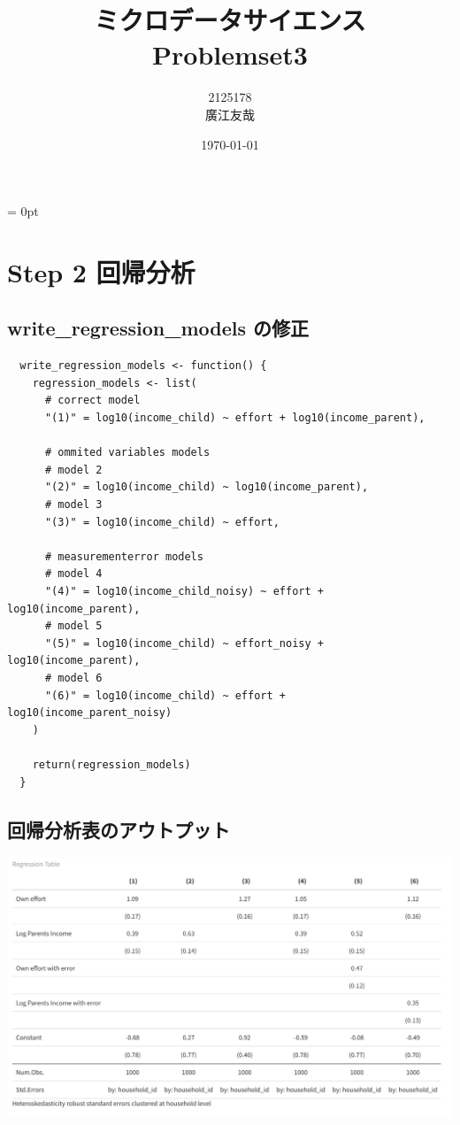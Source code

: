 \documentclass{article}
\begin{document}
\parindent = 0pt

\title{ミクロデータサイエンス\\Problemset3}
\author{2125178\\廣江友哉}
\date{\today}
\maketitle


\section{Step 2 回帰分析}

\subsection{write\_regression\_models の修正}

\begin{lstlisting}
  write_regression_models <- function() {
    regression_models <- list(
      # correct model
      "(1)" = log10(income_child) ~ effort + log10(income_parent),

      # ommited variables models
      # model 2
      "(2)" = log10(income_child) ~ log10(income_parent),
      # model 3
      "(3)" = log10(income_child) ~ effort,

      # measurementerror models
      # model 4
      "(4)" = log10(income_child_noisy) ~ effort + log10(income_parent),
      # model 5
      "(5)" = log10(income_child) ~ effort_noisy + log10(income_parent),
      # model 6
      "(6)" = log10(income_child) ~ effort + log10(income_parent_noisy)
    )

    return(regression_models)
  }
\end{lstlisting}

\subsection{回帰分析表のアウトプット}

\includegraphics[width=18cm]{regression_table.png}
\end{document}
